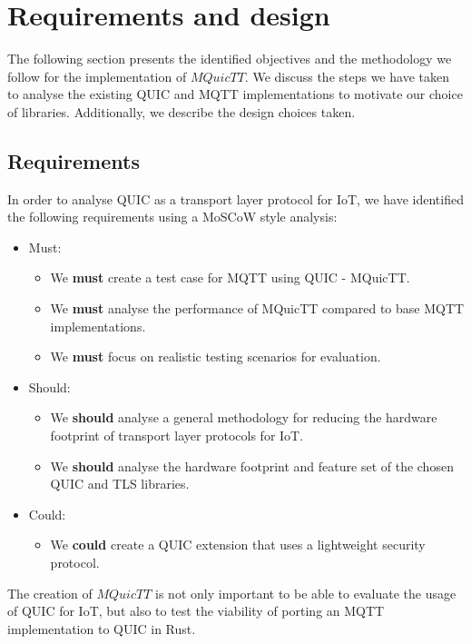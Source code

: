 \chapter{Requirements and design} \label{chap:reqs}

The following section presents the identified objectives and the methodology we follow for the implementation of $MQuicTT$.
We discuss the steps we have taken to analyse the existing QUIC and MQTT implementations to motivate our choice of libraries.
Additionally, we describe the design choices taken.

\section{Requirements}

In order to analyse QUIC as a transport layer protocol for IoT, we have identified the following requirements using a MoSCoW style analysis:

\begin{itemize}
    \item Must:
    \begin{itemize}
        \item We \textbf{must} create a test case for MQTT using QUIC - MQuicTT.
        \item We \textbf{must} analyse the performance of MQuicTT compared to base MQTT implementations.
        \item We \textbf{must} focus on realistic testing scenarios for evaluation.
    \end{itemize}
    \item Should:
    \begin{itemize}
        \item We \textbf{should} analyse a general methodology for reducing the hardware footprint of transport layer protocols for IoT.
        \item We \textbf{should} analyse the hardware footprint and feature set of the chosen QUIC and TLS libraries.
    \end{itemize}
    \item Could:
    \begin{itemize}
        \item We \textbf{could} create a QUIC extension that uses a lightweight security protocol.
    \end{itemize}
\end{itemize}

The creation of $MQuicTT$ is not only important to be able to evaluate the usage of QUIC for IoT, but also to test the viability of porting an MQTT implementation to QUIC in Rust.

